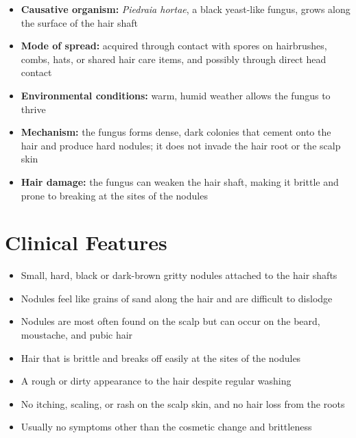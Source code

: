 \begin{itemize}
    \item \textbf{Causative organism:} \textit{Piedraia hortae}, a black yeast-like fungus, grows along the surface of the hair shaft
    \item \textbf{Mode of spread:} acquired through contact with spores on hairbrushes, combs, hats, or shared hair care items, and possibly through direct head contact
    \item \textbf{Environmental conditions:} warm, humid weather allows the fungus to thrive
    \item \textbf{Mechanism:} the fungus forms dense, dark colonies that cement onto the hair and produce hard nodules; it does not invade the hair root or the scalp skin
    \item \textbf{Hair damage:} the fungus can weaken the hair shaft, making it brittle and prone to breaking at the sites of the nodules
\end{itemize}

\section*{Clinical Features}
\begin{itemize}
    \item Small, hard, black or dark-brown gritty nodules attached to the hair shafts
    \item Nodules feel like grains of sand along the hair and are difficult to dislodge
    \item Nodules are most often found on the scalp but can occur on the beard, moustache, and pubic hair
    \item Hair that is brittle and breaks off easily at the sites of the nodules
    \item A rough or dirty appearance to the hair despite regular washing
    \item No itching, scaling, or rash on the scalp skin, and no hair loss from the roots
    \item Usually no symptoms other than the cosmetic change and brittleness
\end{itemize}

